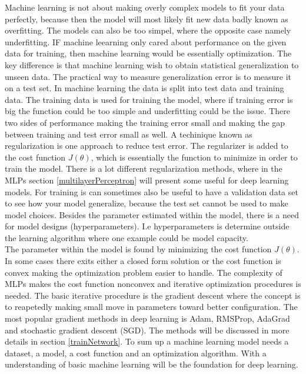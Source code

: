 Machine learning is not about making overly complex models to fit your data perfectly, because then the model will most likely fit new data badly known as overfitting. The models can also be too simpel, where the opposite case namely underfitting. IF machine leearning only cared about performance on the given data for training, then machine learning would be essentially optimization. The key difference is that machine learning wish to obtain statistical generalization to unseen data. The practical way to measure generalization error is to measure it on a test set. In machine learning the data is split into test data and training data. The training data is used for training the model, where if training error is big the function could be too simple and underfitting could be the issue. There two sides of performance making the training error small and making the gap between training and test error small as well. A techinique known as regularization is one approach to reduce test error. The regularizer is added to the cost function $J(\theta)$, which is essentially the function to minimize in order to train the model. There is a lot different regularization methods, where in the MLPs section \ref{multilayerPerceptron} will present some useful for deep learning models. For training is can sometimes also be useful to have a validation data set to see how your model generalize, because the test set cannot be used to make model choices. Besides the parameter estimated within the model, there is a need for model designs (hyperparameters). I.e hyperparameters is determine outside the learning algorithm where one example could be model capacity.\\

The parameter within the model is found by minimizing the cost function $J(\theta)$. In some cases there exits either a closed form solution or the cost function is convex making the optimization problem easier to handle. The complexity of MLPs makes the cost function nonconvex and iterative optimization procedures is needed. The basic iterative procedure is the gradient descent where the concept is to reapetedly making small move in parameters toward better configuration. The most popular gradient methods in deep learning is Adam, RMSProp, AdaGrad and stochastic gradient descent (SGD). The methods will be discussed in more details in section \ref{trainNetwork}. To sum up a machine learning model needs a dataset, a model, a cost function and an optimization algorithm. With a understanding of basic machine learning will be the foundation for deep learning.\\

